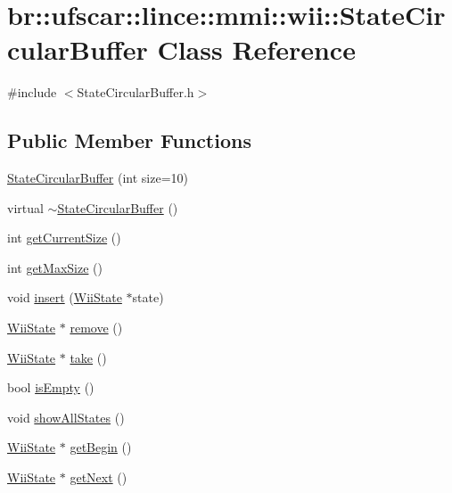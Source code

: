 \hypertarget{classbr_1_1ufscar_1_1lince_1_1mmi_1_1wii_1_1StateCircularBuffer}{
\section{br::ufscar::lince::mmi::wii::StateCircularBuffer Class Reference}
\label{classbr_1_1ufscar_1_1lince_1_1mmi_1_1wii_1_1StateCircularBuffer}
}


{\ttfamily \#include $<$StateCircularBuffer.h$>$}

\subsection*{Public Member Functions}
\begin{DoxyCompactItemize}
\item 
\hyperlink{classbr_1_1ufscar_1_1lince_1_1mmi_1_1wii_1_1StateCircularBuffer_a33314840ca4d71cf5d391e292ca9bc3e}{StateCircularBuffer} (int size=10)
\item 
virtual \hyperlink{classbr_1_1ufscar_1_1lince_1_1mmi_1_1wii_1_1StateCircularBuffer_a9152c8d7c2692a46c07f7e57b5683d72}{$\sim$StateCircularBuffer} ()
\item 
int \hyperlink{classbr_1_1ufscar_1_1lince_1_1mmi_1_1wii_1_1StateCircularBuffer_a8a445af0ab01386fb42cfb2523472ddf}{getCurrentSize} ()
\item 
int \hyperlink{classbr_1_1ufscar_1_1lince_1_1mmi_1_1wii_1_1StateCircularBuffer_a3b762c90ccda72c94da995d8c6d5cac6}{getMaxSize} ()
\item 
void \hyperlink{classbr_1_1ufscar_1_1lince_1_1mmi_1_1wii_1_1StateCircularBuffer_a8d4ed07d00ae3cd16e56c8dbe42c0334}{insert} (\hyperlink{classbr_1_1ufscar_1_1lince_1_1mmi_1_1wii_1_1WiiState}{WiiState} $\ast$state)
\item 
\hyperlink{classbr_1_1ufscar_1_1lince_1_1mmi_1_1wii_1_1WiiState}{WiiState} $\ast$ \hyperlink{classbr_1_1ufscar_1_1lince_1_1mmi_1_1wii_1_1StateCircularBuffer_a41bb3dd2846d5038b69fce4d65ba907a}{remove} ()
\item 
\hyperlink{classbr_1_1ufscar_1_1lince_1_1mmi_1_1wii_1_1WiiState}{WiiState} $\ast$ \hyperlink{classbr_1_1ufscar_1_1lince_1_1mmi_1_1wii_1_1StateCircularBuffer_a369047a3b4e1d99e0a997b8ab7e1a476}{take} ()
\item 
bool \hyperlink{classbr_1_1ufscar_1_1lince_1_1mmi_1_1wii_1_1StateCircularBuffer_a4beeb8af8698021f10d719b77d5c4427}{isEmpty} ()
\item 
void \hyperlink{classbr_1_1ufscar_1_1lince_1_1mmi_1_1wii_1_1StateCircularBuffer_ad5e7282be7550aaa267eea85c4f569a2}{showAllStates} ()
\item 
\hyperlink{classbr_1_1ufscar_1_1lince_1_1mmi_1_1wii_1_1WiiState}{WiiState} $\ast$ \hyperlink{classbr_1_1ufscar_1_1lince_1_1mmi_1_1wii_1_1StateCircularBuffer_aaf271d9993fd69eaff64a6b31bb6173f}{getBegin} ()
\item 
\hyperlink{classbr_1_1ufscar_1_1lince_1_1mmi_1_1wii_1_1WiiState}{WiiState} $\ast$ \hyperlink{classbr_1_1ufscar_1_1lince_1_1mmi_1_1wii_1_1StateCircularBuffer_ae29b35bd8e817d3dfb8c10b51c920e1a}{getNext} ()
\end{DoxyCompactItemize}


